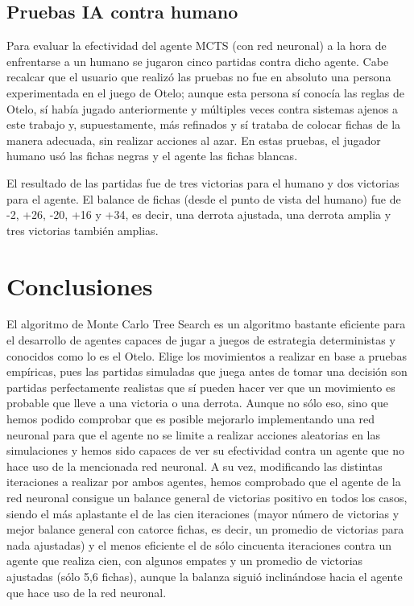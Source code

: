 \documentclass[conference]{IEEEtran}
\begin{document}
\subsection{Pruebas IA contra humano}
Para evaluar la efectividad del agente MCTS (con red neuronal) a la hora de enfrentarse a un humano se jugaron cinco partidas contra dicho agente. Cabe recalcar que el usuario que realizó las pruebas no fue en absoluto una persona experimentada en el juego de Otelo; aunque esta persona sí conocía las reglas de Otelo, sí había jugado anteriormente y múltiples veces contra sistemas ajenos a este trabajo y, supuestamente, más refinados y sí trataba de colocar fichas de la manera adecuada, sin realizar acciones al azar. En estas pruebas, el jugador humano usó las fichas negras y el agente las fichas blancas.

El resultado de las partidas fue de tres victorias para el humano y dos victorias para el agente. El balance de fichas (desde el punto de vista del humano) fue de -2, +26, -20, +16 y +34, es decir, una derrota ajustada, una derrota amplia y tres victorias también amplias.

\section{Conclusiones}
El algoritmo de Monte Carlo Tree Search es un algoritmo bastante eficiente para el desarrollo de agentes capaces de jugar a juegos de estrategia deterministas y conocidos como lo es el Otelo. Elige los movimientos a realizar en base a pruebas empíricas, pues las partidas simuladas que juega antes de tomar una decisión son partidas perfectamente realistas que sí pueden hacer ver que un movimiento es probable que lleve a una victoria o una derrota. Aunque no sólo eso, sino que hemos podido comprobar que es posible mejorarlo implementando una red neuronal para que el agente no se limite a realizar acciones aleatorias en las simulaciones y hemos sido capaces de ver su efectividad contra un agente que no hace uso de la mencionada red neuronal. A su vez, modificando las distintas iteraciones a realizar por ambos agentes, hemos comprobado que el agente de la red neuronal consigue un balance general de victorias positivo en todos los casos, siendo el más aplastante el de las cien iteraciones (mayor número de victorias y mejor balance general con catorce fichas, es decir, un promedio de victorias para nada ajustadas) y el menos eficiente el de sólo cincuenta iteraciones contra un agente que realiza cien, con algunos empates y un promedio de victorias ajustadas (sólo 5,6 fichas), aunque la balanza siguió inclinándose hacia el agente que hace uso de la red neuronal. 
\end{document}
